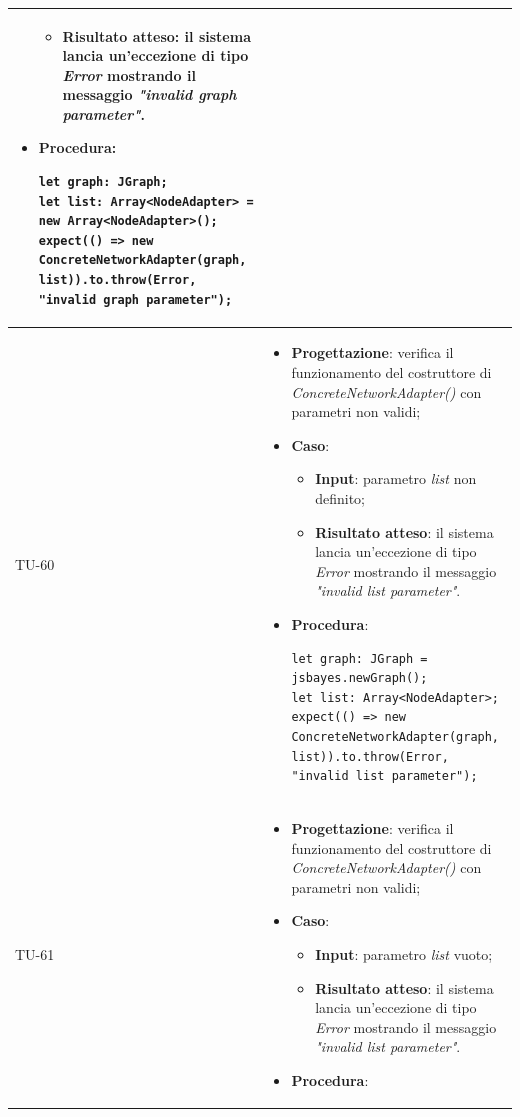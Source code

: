 \begin{longtable}{|C{1.5cm}|C{14.5cm}|}
\begin{itemize}
\begin{itemize}
			\item \textbf{Risultato atteso}: il sistema lancia un'eccezione di tipo \emph{Error} mostrando il messaggio \emph{"invalid graph parameter"}.
		\end{itemize}
		\item \textbf{Procedura}:
		\begin{lstlisting}
let graph: JGraph;
let list: Array<NodeAdapter> = new Array<NodeAdapter>();
expect(() => new ConcreteNetworkAdapter(graph, list)).to.throw(Error, "invalid graph parameter");
		\end{lstlisting}
	\end{itemize}\\
	\hline
	{TU-60} &
	\begin{itemize}
		\item \textbf{Progettazione}: verifica il funzionamento del costruttore di \emph{ConcreteNetworkAdapter()} con parametri non validi;
		\item \textbf{Caso}: 
		\begin{itemize}
			\item \textbf{Input}: parametro \emph{list} non definito;
			\item \textbf{Risultato atteso}: il sistema lancia un'eccezione di tipo \emph{Error} mostrando il messaggio \emph{"invalid list parameter"}.
		\end{itemize}
		\item \textbf{Procedura}:
		\begin{lstlisting}
let graph: JGraph = jsbayes.newGraph();
let list: Array<NodeAdapter>;
expect(() => new ConcreteNetworkAdapter(graph, list)).to.throw(Error, "invalid list parameter");
		\end{lstlisting}
	\end{itemize}\\
	\hline
	{TU-61} &
	\begin{itemize}
		\item \textbf{Progettazione}: verifica il funzionamento del costruttore di \emph{ConcreteNetworkAdapter()} con parametri non validi;
		\item \textbf{Caso}: 
		\begin{itemize}
			\item \textbf{Input}: parametro \emph{list} vuoto;
			\item \textbf{Risultato atteso}: il sistema lancia un'eccezione di tipo \emph{Error} mostrando il messaggio \emph{"invalid list parameter"}.
		\end{itemize}
		\item \textbf{Procedura}:

\end{itemize}
\end{longtable}
